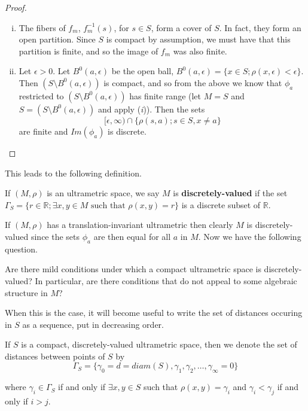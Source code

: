 \begin{proof}
\cite{ar} 
\begin{enumerate}[(i)]
\item The fibers of $f_m$, $f_m^{-1}(s)$, for $s \in S$, form a cover of $S$. In fact, they form an open partition. Since $S$ is compact by assumption, we must have that this partition is finite, and so the image of $f_m$ was also finite.
\item Let $\epsilon >0$. Let $B^0(a,\epsilon)$ be the open ball, $B^0(a,\epsilon)= \{x \in S; \rho(x,\epsilon) < \epsilon\}$. Then $(S\setminus B^0(a,\epsilon))$ is compact, and so from the above we know that $\phi_{a}$ restricted to $(S\setminus B^0(a,\epsilon))$ has finite range (let $M = S$ and $S = (S\setminus B^0(a, \epsilon))$ and apply (\textit{i})). Then the sets \[ [\epsilon, \infty) \cap \{\rho(s,a); s \in S, x \neq a\} \] are finite and $Im(\phi_a)$ is discrete.
\end{enumerate}
\end{proof}

This leads to the following definition.

\begin{definition}
If $(M, \rho)$ is an ultrametric space, we say $M$ is \textbf{discretely-valued} if the set $\Gamma_S = \{r \in \mathbb{R}; \exists x,y \in M \text{ such that } \rho(x,y)=r\}$ is a discrete subset of $\mathbb{R}$.
\end{definition}

If $(M,\rho)$ has a translation-invariant ultrametric then clearly $M$ is discretely-valued since the sets $\phi_a$ are then equal for all $a$ in $M$. Now we have the following question.

\begin{question}
	Are there mild conditions under which a compact ultrametric space is discretely-valued? In particular, are there conditions that do not appeal to some algebraic structure in $M$?
\end{question}

When this is the case, it will become useful to write the set of distances occuring in $S$ as a sequence, put in decreasing order. 

\begin{notation*}
	If $S$ is a compact, discretely-valued ultrametric space, then we denote the set of distances between points of $S$ by 
	$$\Gamma_S = \{\gamma_0 = d =diam(S), \gamma_1, \gamma_2, \ldots, \gamma_\infty =0 \}$$
	
	where $\gamma_i \in  \Gamma_S$ if and only if $\exists x,y \in S$ such that $\rho(x,y) = \gamma_i$ and  $\gamma_i < \gamma_j$ if and only if $i > j$. 
\end{notation*}


